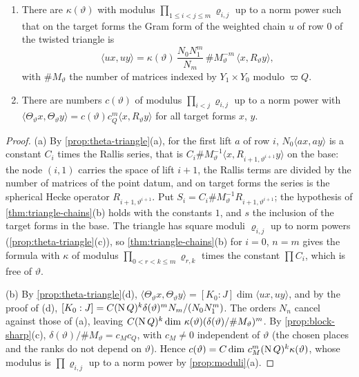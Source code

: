 \begin{lemma}\label{lem:chain-gram}
\begin{enumerate}[label=\textup{(\alph*)}]
\item There are $\kappa(\vartheta)$ with modulus $\prod_{1\le i<j\le m}\varrho_{i,j}$ up to a norm power such that on the target forms the Gram form of the weighted chain $u$ of row $0$ of the twisted triangle is
\[
  \langle ux,uy\rangle=\kappa(\vartheta)\,\frac{N_0N_1^m}{N_m}\,\#M_\vartheta^{-m}\,\langle x,R_\vartheta y\rangle,
\]
with $\#M_\vartheta$ the number of matrices indexed by $Y_1\times Y_0$ modulo $\varpi Q$.
\item There are numbers $c(\vartheta)$ of modulus $\prod_{i<j}\varrho_{i,j}$ up to a norm power with $\langle\Theta_\vartheta x,\Theta_\vartheta y\rangle=c(\vartheta)c_Q^m\langle x,R_\vartheta y\rangle$ for all target forms $x$, $y$.
\end{enumerate}
\end{lemma}

\begin{proof}
(a) By \cref{prop:theta-triangle}(a), for the first lift $a$ of row $i$, $N_0\langle ax,ay\rangle$ is a constant $C_i$ times the Rallis series, that is $C_i\#M_\vartheta^{-1}\langle x,R_{i+1,\vartheta^{i+1}}y\rangle$ on the base: the
node $(i,1)$ carries the space of lift $i+1$, the Rallis terms are divided by the number of matrices of the point datum, and on target forms the series is the spherical Hecke operator $R_{i+1,\vartheta^{i+1}}$. Put
$S_i=C_i\#M_\vartheta^{-1}R_{i+1,\vartheta^{i+1}}$; the hypothesis of \cref{thm:triangle-chains}(b) holds with the constants $1$, and $s$ the inclusion of the target forms in the base. The triangle has square moduli
$\varrho_{i,j}$ up to norm powers (\cref{prop:theta-triangle}(c)), so \cref{thm:triangle-chains}(b) for $i=0$, $n=m$ gives the formula with $\kappa$ of modulus $\prod_{0<r<k\le m}\varrho_{r,k}$ times the constant
$\prod C_i$, which is free of $\vartheta$.

(b) By \cref{prop:theta-triangle}(d), $\langle\Theta_\vartheta x,\Theta_\vartheta y\rangle=[K_0:J]\dim\langle ux,uy\rangle$, and by the proof of (d), $[K_0:J]=C(\operatorname{N} Q)^k\delta(\vartheta)^mN_m/(N_0N_1^m)$. The orders $N_n$ cancel against those of (a),
leaving $C(\operatorname{N} Q)^k\dim\,\kappa(\vartheta)(\delta(\vartheta)/\#M_\vartheta)^m$. By \cref{prop:block-sharp}(c), $\delta(\vartheta)/\#M_\vartheta=c_Mc_Q$, with $c_M\ne0$ independent of $\vartheta$ (the chosen places and the ranks do not depend
on $\vartheta$). Hence $c(\vartheta)=C\dim\,c_M^m(\operatorname{N} Q)^k\kappa(\vartheta)$, whose modulus is $\prod\varrho_{i,j}$ up to a norm power by \cref{prop:moduli}(a).
\end{proof}

